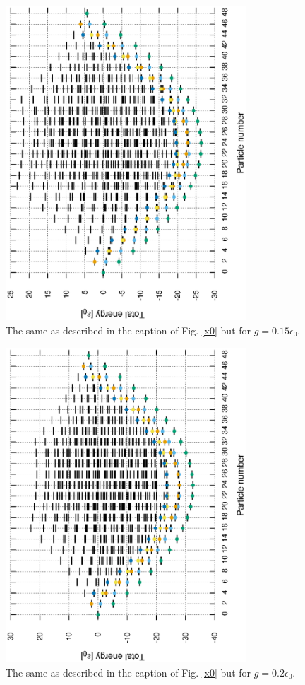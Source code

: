 \documentclass[11pt]{book} %
\begin{document}
\begin{figure}[htbp]
 \begin{center}
  \includegraphics[width=90mm,angle=-90]{images/spectra_g0p15.eps}
 \end{center}
 \caption{The same as described in the caption of Fig. \ref{x0} but for $g=0.15\epsilon_0$.
	}
 \label{g0p15}
\end{figure}

\begin{figure}[htbp]
 \begin{center}
  \includegraphics[width=90mm,angle=-90]{images/spectra_g0p2.eps}
 \end{center}
 \caption{The same as described in the caption of Fig. \ref{x0} but for $g=0.2\epsilon_0$.
	}
 \label{g0p2}
\end{figure}



\end{document}
